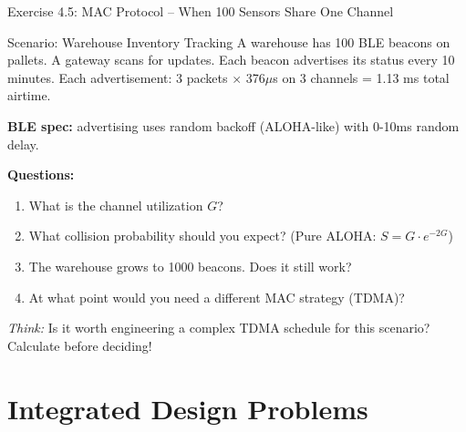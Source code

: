 \documentclass[aspectratio=169,11pt]{beamer}
\begin{document}
\begin{frame}{Exercise 4.5: MAC Protocol -- When 100 Sensors Share One Channel}
    \begin{block}{Scenario: Warehouse Inventory Tracking}
        A warehouse has 100 BLE beacons on pallets. A gateway scans for updates. Each beacon advertises its status every 10 minutes. Each advertisement: 3 packets $\times$ 376$\mu$s on 3 channels = 1.13 ms total airtime.
        
        \vspace{0.2cm}
        \textbf{BLE spec:} advertising uses random backoff (ALOHA-like) with 0-10ms random delay.
    \end{block}
    
    \textbf{Questions:}
    \begin{enumerate}
        \item What is the channel utilization $G$?
        \item What collision probability should you expect? (Pure ALOHA: $S = G \cdot e^{-2G}$)
        \item The warehouse grows to 1000 beacons. Does it still work?
        \item At what point would you need a different MAC strategy (TDMA)?
    \end{enumerate}
    
    {\footnotesize \textit{Think:} Is it worth engineering a complex TDMA schedule for this scenario? Calculate before deciding!}
\end{frame}

\section{Integrated Design Problems}
\end{document}
